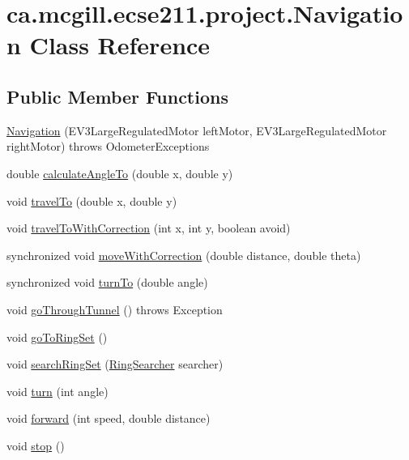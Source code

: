 \hypertarget{classca_1_1mcgill_1_1ecse211_1_1project_1_1_navigation}{}\section{ca.\+mcgill.\+ecse211.\+project.\+Navigation Class Reference}
\label{classca_1_1mcgill_1_1ecse211_1_1project_1_1_navigation}
\subsection*{Public Member Functions}
\begin{DoxyCompactItemize}
\item 
\hyperlink{classca_1_1mcgill_1_1ecse211_1_1project_1_1_navigation_aaee14b67c392ddd951e3ce21224c3e56}{Navigation} (E\+V3\+Large\+Regulated\+Motor left\+Motor, E\+V3\+Large\+Regulated\+Motor right\+Motor)  throws Odometer\+Exceptions 
\item 
double \hyperlink{classca_1_1mcgill_1_1ecse211_1_1project_1_1_navigation_a4376e54162df8f123ca3b52e4fd2f38d}{calculate\+Angle\+To} (double x, double y)
\item 
void \hyperlink{classca_1_1mcgill_1_1ecse211_1_1project_1_1_navigation_ad89b3dd084d81b4ec4d89ea73ba13eaa}{travel\+To} (double x, double y)
\item 
void \hyperlink{classca_1_1mcgill_1_1ecse211_1_1project_1_1_navigation_ae7230e905494002087416294f12cae6a}{travel\+To\+With\+Correction} (int x, int y, boolean avoid)
\item 
synchronized void \hyperlink{classca_1_1mcgill_1_1ecse211_1_1project_1_1_navigation_a48eeb9ae2da23664421e8da5642054c7}{move\+With\+Correction} (double distance, double theta)
\item 
synchronized void \hyperlink{classca_1_1mcgill_1_1ecse211_1_1project_1_1_navigation_a3bbe0645f2b3b3d0986b4a707fb5a00c}{turn\+To} (double angle)
\item 
void \hyperlink{classca_1_1mcgill_1_1ecse211_1_1project_1_1_navigation_a4b52e605d3ea2f9bcd9481ae2c69ba39}{go\+Through\+Tunnel} ()  throws Exception 
\item 
void \hyperlink{classca_1_1mcgill_1_1ecse211_1_1project_1_1_navigation_a0016a23ab5d544148a09948fb1a40e4c}{go\+To\+Ring\+Set} ()
\item 
void \hyperlink{classca_1_1mcgill_1_1ecse211_1_1project_1_1_navigation_a720271c3961b2819183210ad6106beff}{search\+Ring\+Set} (\hyperlink{classca_1_1mcgill_1_1ecse211_1_1threads_1_1_ring_searcher}{Ring\+Searcher} searcher)
\item 
void \hyperlink{classca_1_1mcgill_1_1ecse211_1_1project_1_1_navigation_ad74286ad36d333bfaf57661837457b76}{turn} (int angle)
\item 
void \hyperlink{classca_1_1mcgill_1_1ecse211_1_1project_1_1_navigation_a7c66610c5b7496ddb35d342ab2cd3f08}{forward} (int speed, double distance)
\item 
void \hyperlink{classca_1_1mcgill_1_1ecse211_1_1project_1_1_navigation_ae8530d181ffd790ff9dea5eeab54b1a1}{stop} ()
\end{DoxyCompactItemize}
